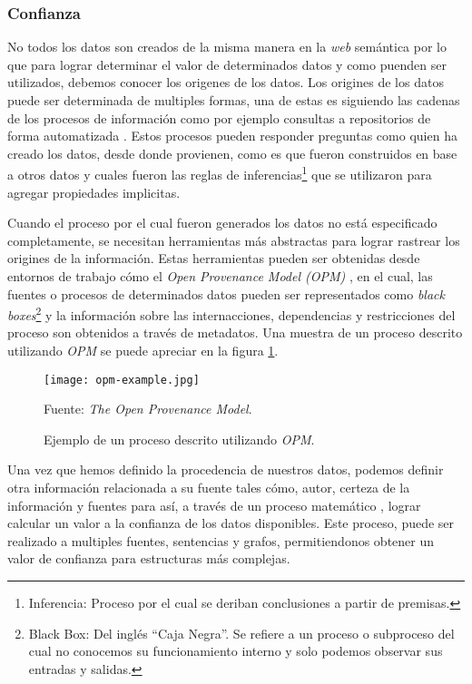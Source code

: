 \subsubsection{Confianza}

No todos los datos son creados de la misma manera en la \textit{web} semántica
por lo que para lograr determinar el valor de determinados datos y como puenden
ser utilizados, debemos conocer los origenes de los datos. Los origines de los
datos puede ser determinada de multiples formas, una de estas es siguiendo las
cadenas de los procesos de información como por ejemplo consultas a repositorios
de forma automatizada \cite{dividino2009querying} \cite{flouris2009coloring}.
Estos procesos pueden responder preguntas como quien ha creado los datos, desde
donde provienen, como es que fueron construidos en base a otros datos y cuales
fueron las reglas de inferencias\footnote{Inferencia: Proceso por el cual se
deriban conclusiones a partir de premisas.} que se utilizaron para agregar
propiedades implicitas.

Cuando el proceso por el cual fueron generados los datos no está especificado
completamente, se necesitan herramientas más abstractas para lograr rastrear los
origines de la información. Estas herramientas pueden ser obtenidas desde
entornos de trabajo cómo el \textit{Open Provenance Model (OPM)}
\cite{moreau2008open}, en el cual, las fuentes o procesos de determinados datos
pueden ser representados como \textit{black boxes}\footnote{Black Box: Del
inglés ``Caja Negra''. Se refiere a un proceso o subproceso del cual no
conocemos su funcionamiento interno y solo podemos observar sus entradas y
salidas.} y la información sobre las internacciones, dependencias y
restricciones del proceso son obtenidos a través de metadatos. Una muestra de un
proceso descrito utilizando \textit{OPM} se puede apreciar en la figura
\ref{fig:opm-example}.

\begin{figure}
    \centering
    \texttt{[image: opm-example.jpg]}
    \caption{Ejemplo de un proceso descrito utilizando \textit{OPM}.} Fuente:
    \textit{The Open Provenance Model}.
    \label{fig:opm-example}
\end{figure}

Una vez que hemos definido la procedencia de nuestros datos, podemos definir
otra información relacionada a su fuente tales cómo, autor, certeza de la
información y fuentes para así, a través de un proceso matemático
\cite{dividino2009provenance}, lograr calcular un valor a la confianza de los
datos disponibles. Este proceso, puede ser realizado a multiples fuentes,
sentencias y grafos, permitiendonos obtener un valor de confianza para
estructuras más complejas.

